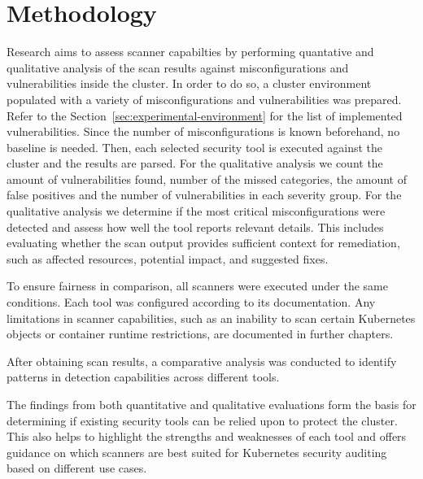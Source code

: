 \section{Methodology}
\label{sec:methodology}

Research aims to assess scanner capabilties by performing quantative and qualitative analysis of the scan results against misconfigurations and vulnerabilities inside the cluster. In order to do so, a cluster environment populated with a variety of misconfigurations and vulnerabilities was prepared. Refer to the Section~\ref{sec:experimental-environment} for the list of implemented vulnerabilities. Since the number of misconfigurations is known beforehand, no baseline is needed. Then, each selected security tool is executed against the cluster and the results are parsed. For the qualitative analysis we count the amount of vulnerabilities found, number of the missed categories, the amount of false positives and the number of vulnerabilities in each severity group. For the qualitative analysis we determine if the most critical misconfigurations were detected and assess how well the tool reports relevant details. This includes evaluating whether the scan output provides sufficient context for remediation, such as affected resources, potential impact, and suggested fixes.

To ensure fairness in comparison, all scanners were executed under the same conditions. Each tool was configured according to its documentation. Any limitations in scanner capabilities, such as an inability to scan certain Kubernetes objects or container runtime restrictions, are documented in further chapters.

After obtaining scan results, a comparative analysis was conducted to identify patterns in detection capabilities across different tools.

The findings from both quantitative and qualitative evaluations form the basis for determining if existing security tools can be relied upon to protect the cluster. This also helps to highlight the strengths and weaknesses of each tool and offers guidance on which scanners are best suited for Kubernetes security auditing based on different use cases.